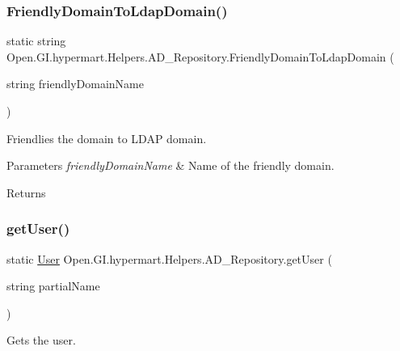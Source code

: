 \subsubsection{\texorpdfstring{Friendly\+Domain\+To\+Ldap\+Domain()}{FriendlyDomainToLdapDomain()}}
{\footnotesize\ttfamily static string Open.\+G\+I.\+hypermart.\+Helpers.\+A\+D\+\_\+\+Repository.\+Friendly\+Domain\+To\+Ldap\+Domain (\begin{DoxyParamCaption}\item[{string}]{friendly\+Domain\+Name }\end{DoxyParamCaption})\hspace{0.3cm}{\ttfamily [static]}}



Friendlies the domain to L\+D\+AP domain. 


\begin{DoxyParams}{Parameters}
{\em friendly\+Domain\+Name} & Name of the friendly domain.\\
\hline
\end{DoxyParams}
\begin{DoxyReturn}{Returns}

\end{DoxyReturn}
\hypertarget{class_open_1_1_g_i_1_1hypermart_1_1_helpers_1_1_a_d___repository_ab3cdd5f9a962e26fcb50033a5dc4fc0f}{}\label{class_open_1_1_g_i_1_1hypermart_1_1_helpers_1_1_a_d___repository_ab3cdd5f9a962e26fcb50033a5dc4fc0f} 
\subsubsection{\texorpdfstring{get\+User()}{getUser()}}
{\footnotesize\ttfamily static \hyperlink{class_open_1_1_g_i_1_1hypermart_1_1_models_1_1_user}{User} Open.\+G\+I.\+hypermart.\+Helpers.\+A\+D\+\_\+\+Repository.\+get\+User (\begin{DoxyParamCaption}\item[{string}]{partial\+Name }\end{DoxyParamCaption})\hspace{0.3cm}{\ttfamily [static]}}



Gets the user. 



